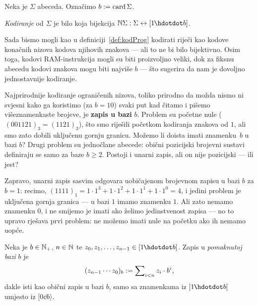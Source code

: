 \begin{definicija}[{name=[kodiranje abecede]}]
Neka je $\Sigma$ abeceda. Označimo $b:=\operatorname{card}\Sigma$. %

	\emph{Kodiranje} od $\Sigma$ je bilo koja bijekcija $\N\Sigma:\Sigma\leftrightarrow[1\mspace{-1mu}\dd b]$.
\end{definicija}


Sada bismo mogli kao u definiciji~\ref{def:kodProg} kodirati riječi kao kodove konačnih nizova kodova njihovih znakova --- ali to ne bi bilo bijektivno. Osim toga, kodovi RAM-instrukcija mogli su biti proizvoljno veliki, dok za fiksnu abecedu kodovi znakova mogu biti najviše $b$ --- što sugerira da nam je dovoljno jednostavnije kodiranje.

Najprirodnije kodiranje ograničenih nizova, toliko prirodno da možda nismo ni svjesni kako ga koristimo (za $b=10$) svaki put kad čitamo i pišemo višeznamenkaste brojeve, je \textbf{zapis u bazi} $b$. Problem su početne nule ($\mspace{1mu}(001121)_3=(1121)_3$), što smo riješili početkom kodiranja znakova od $1$, ali smo zato dobili uključenu gornju granicu. Možemo li doista imati zna\-men\-ku~$b$ u bazi $b$? Drugi problem su jednočlane abecede: obični pozicijski brojevni sustavi definiraju se samo za baze $b\ge2$. Postoji i unarni zapis, ali on nije pozicijski --- ili jest?

Zapravo, unarni zapis sasvim odgovara uobičajenom brojevnom zapisu u bazi $b$ za $b=1$: recimo, $(1111)_1=1\cdot1^3+1\cdot1^2+1\cdot1^1+1\cdot1^0=4$, i jedini problem je uključena gornja granica --- u bazi $1$ imamo znamenku $1$. Ali zato nemamo znamenku $0$, i ne smijemo je imati ako želimo jedinstvenost zapisa --- no to upravo rješava prvi problem: ne možemo imati nule na početku ako ih nemamo uopće.

\begin{definicija}[{name=[zapis broja u pomaknutoj bazi]}]
	Neka je $b\in{\mathbb N}_+$, $n\in{\mathbb N}$ te $z_0,z_1,\dotsc,z_{n-1}\in[1\mspace{-1mu}\dd b]$. Zapis u \emph{pomaknutoj bazi} $b$ je %
\begin{equation}\label{eq:pomakbaza}
    (z_{n-1}\dotsm z_0)_b:=\sum\nolimits_{i<n}z_i\cdot b^i\text,
\end{equation}
	dakle isti kao obični zapis u bazi $b$, samo sa znamenkama iz $[1\mspace{-1mu}\dd b]$ umjesto iz $[0\dd b\rangle$.
\end{definicija}

